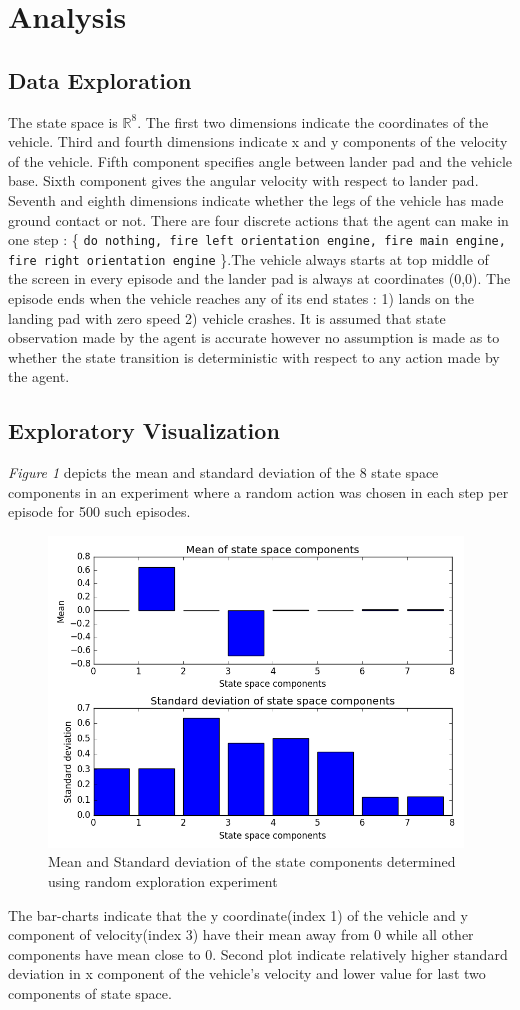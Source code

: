 \documentclass{article}
\begin{document}
\section{Analysis}
\subsection*{Data Exploration}
The state space is $\mathbb{R}^8$. The first two dimensions indicate the coordinates of the vehicle. Third and fourth dimensions indicate x and y components of the velocity of the vehicle. Fifth component specifies angle between lander pad and the vehicle base. Sixth component gives the angular velocity with respect to lander pad. Seventh and eighth dimensions indicate whether the legs of the vehicle has made ground contact or not. There are four discrete actions that the agent can make in one step : \{ \texttt{do nothing, fire left orientation engine, fire main engine, fire right orientation engine} \}.The vehicle always starts at top middle of the screen in every episode and the lander pad is always at coordinates (0,0). The episode ends when the vehicle reaches any of its end states : 1) lands on the landing pad with zero speed 2) vehicle crashes. It is assumed that state observation made by the agent is accurate however no assumption is made as to whether the state transition is deterministic with respect to any action made by the agent.
\subsection*{Exploratory Visualization}
\textit{Figure 1} depicts the mean and standard deviation of the 8 state space components in an experiment where a random action was chosen in each step per episode for 500 such episodes.\\
\begin{figure}[H]
	\caption{Mean and Standard deviation of the state components determined using random exploration experiment}
	\centering
	\includegraphics[width=11cm]{img/state-space}
\end{figure}
The bar-charts indicate that the y coordinate(index 1) of the vehicle and y component of velocity(index 3) have their mean away from 0 while all other components have mean close to 0. Second plot indicate relatively higher standard deviation in x component of the vehicle's velocity and lower value for last two components of state space.
\end{document}
